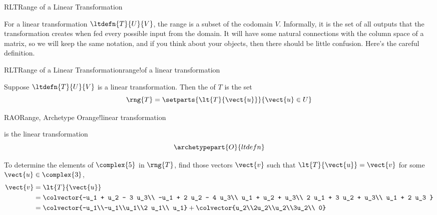 \begin{subsect}{RLT}{Range of a Linear Transformation}
%
\begin{para}For a linear transformation $\ltdefn{T}{U}{V}$, the range is a subset of the codomain $V$.  Informally, it is the set of all outputs that the transformation creates when fed every possible input from the domain.  It will have some natural connections with the column space of a matrix, so we will keep the same notation, and if you think about your objects, then there should be little confusion.  Here's the careful definition.\end{para}
%
\begin{definition}{RLT}{Range of a Linear Transformation}{range!of a linear transformation}
\begin{para}Suppose $\ltdefn{T}{U}{V}$ is a linear transformation.  Then the  of $T$ is the set
%
\begin{equation*}
\rng{T}=\setparts{\lt{T}{\vect{u}}}{\vect{u}\in U}
\end{equation*}
\end{para}
%
\end{definition}
%
\begin{example}{RAO}{Range, Archetype O}{range!linear transformation}
\begin{para} is the linear transformation
%
\begin{equation*}
\archetypepart{O}{ltdefn}\end{equation*}
\end{para}
%
\begin{para}To determine the elements of $\complex{5}$ in $\rng{T}$, find those vectors $\vect{v}$ such that $\lt{T}{\vect{u}}=\vect{v}$ for some $\vect{u}\in\complex{3}$,
%
\begin{align*}
\vect{v}&=\lt{T}{\vect{u}}\\
&=\colvector{-u_1 + u_2 - 3 u_3\\
-u_1 + 2 u_2 - 4 u_3\\
u_1 + u_2 + u_3\\
2 u_1 + 3 u_2 + u_3\\
u_1 + 2 u_3
}\\
&=
\colvector{-u_1\\-u_1\\u_1\\2 u_1\\ u_1}
+
\colvector{u_2\\2u_2\\u_2\\3u_2\\ 0}

\end{align*}
\end{para}
\end{example}
\end{subsect}
